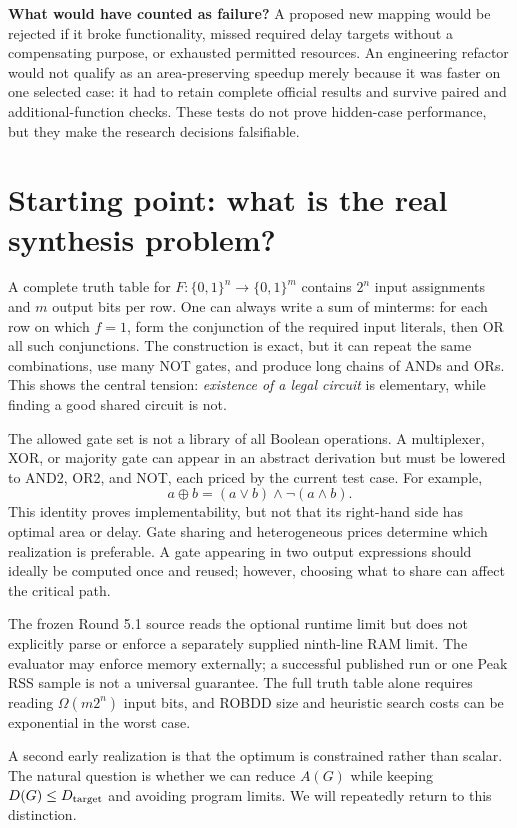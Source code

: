 \documentclass[a4paper,10pt]{article}
\theoremstyle{definition}
\theoremstyle{remark}
\newcounter{problem}
\begin{document}
\noindent\textbf{What would have counted as failure?} A proposed new mapping would be rejected if it broke functionality, missed required delay targets without a compensating purpose, or exhausted permitted resources. An engineering refactor would not qualify as an area-preserving speedup merely because it was faster on one selected case: it had to retain complete official results and survive paired and additional-function checks. These tests do not prove hidden-case performance, but they make the research decisions falsifiable.

\section{Starting point: what is the real synthesis problem?}
A complete truth table for $F:\{0,1\}^n\to\{0,1\}^m$ contains $2^n$ input assignments and $m$ output bits per row. One can always write a sum of minterms: for each row on which $f=1$, form the conjunction of the required input literals, then OR all such conjunctions. The construction is exact, but it can repeat the same combinations, use many NOT gates, and produce long chains of ANDs and ORs. This shows the central tension: \emph{existence of a legal circuit} is elementary, while finding a good shared circuit is not.

The allowed gate set is not a library of all Boolean operations. A multiplexer, XOR, or majority gate can appear in an abstract derivation but must be lowered to AND2, OR2, and NOT, each priced by the current test case. For example,
\begin{equation}
 a\oplus b=(a\lor b)\land\neg(a\land b).
\end{equation}
This identity proves implementability, but not that its right-hand side has optimal area or delay. Gate sharing and heterogeneous prices determine which realization is preferable. A gate appearing in two output expressions should ideally be computed once and reused; however, choosing what to share can affect the critical path.

The frozen Round 5.1 source reads the optional runtime limit but does not explicitly parse or enforce a separately supplied ninth-line RAM limit. The evaluator may enforce memory externally; a successful published run or one Peak RSS sample is not a universal guarantee. The full truth table alone requires reading $\Omega(m2^n)$ input bits, and ROBDD size and heuristic search costs can be exponential in the worst case.

A second early realization is that the optimum is constrained rather than scalar. The natural question is whether we can reduce $A(G)$ while keeping $D(G)\le D_{\rm target}$ and avoiding program limits. We will repeatedly return to this distinction.
\end{document}
